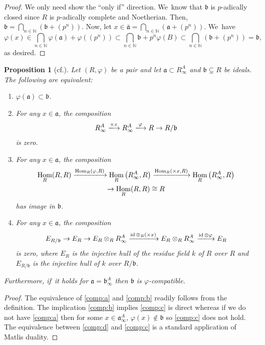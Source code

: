 \documentclass[11pt]{article}
\newcommand{\cf}{cf.\xspace}
\theoremstyle{plain}
\newtheorem{proposition}[theorem]{Proposition}
\theoremstyle{definition}
\numberwithin{equation}{theorem}
\let\tensor\otimes
\newcommand{\N}{\mathbb {N}}
\newcommand{\fra}{\mathfrak{a}}
\newcommand{\frab}{\mathfrak{b}}
\DeclareMathOperator{\Hom}{Hom}
\DeclareMathOperator{\id}{{id}}
\renewcommand{\phi}{\varphi}
\newcommand{\rphi}{(R,\phi)}
\newcommand{\rafty}{R^A_\infty}
\newcommand{\aafty}{\fra^A_\infty}
\begin{document}
\begin{proof}
We only need show the ``only if'' direction. We~know that $\frab$ is $p$-adically closed since $R$ is $p$-adically complete and Noetherian. Then, $\frab=\bigcap_{n\in \N} (\frab+ (p^n))$. Now, let $x\in \bar{\fra} = \bigcap_{n\in \N} (\fra+ (p^n))$. We~have \[
\phi(x)\in \bigcap_{n\in \N} \phi(\fra)+\phi((p^n))\subset \bigcap_{n\in \N} \frab+p^n\phi\left(B\right) \subset \bigcap_{n\in \N} (\frab+ (p^n))=\frab,
\]
as desired.
\end{proof}

\begin{proposition}[{\cf \cite[Lem.\,5.1]{SchwedeCentersOfFPurity}}]\label{comp ideal of pair injective hull}
Let $\rphi$ be a pair and let $\fra\subset \rafty$ and $\frab \subsetneq R$ be ideals. The following are equivalent:

\begin{enumerate}
\item\label{comp:a} $\phi\left(\fra\right)\subset \frab$.
\item\label{comp:b} For any $x\in \fra$, the composition\vspace*{-3pt}
\[
\rafty \xlongrightarrow{\times x} \rafty \xlongrightarrow{\phi} R \to R/\frab
\]
is zero.
\item\label{comp:c} For any $x\in \fra$, the composition\vspace*{-5pt}
\begin{multline*}
\Hom_R(R,R)\xlongrightarrow{\Hom_R(\phi,R)}\Hom_R\left(\rafty,R\right)\xlongrightarrow{\Hom_R(\times x, R)}\Hom_R\left(\rafty,R\right)\\
\to \Hom_R(R,R)\cong R
\end{multline*}
has image in $\frab$.
\item\label{comp:d}
For any $x\in \fra$, the composition\vspace*{-3pt}
\[
E_{R/\frab} \to E_R \to E_R\tensor_R \rafty \xlongrightarrow{\id\tensor_R (\times x)} E_R\tensor_R \rafty \xlongrightarrow{\id \tensor \phi} E_R
\]
is zero, where $E_R$ is the injective hull of the residue field $k$ of $R$ over $R$ and $E_{R/\frab} $ is the injective hull of $k$ over $R/\frab$.
\end{enumerate}

Furthermore, if~it holds for $\fra=\frab^A_\infty$ then $\frab$ is $\phi$-compatible.
\end{proposition}

\begin{proof}
The equivalence of \eqref{comp:a} and \eqref{comp:b} readily follows from the definition. The implication \eqref{comp:b} implies \eqref{comp:c} is direct whereas if we do not have \eqref{comp:a} then for some $x\in \aafty$, $\phi(x)\notin \frab$ so \eqref{comp:c} does not hold.
The equivalence between \eqref{comp:d} and \eqref{comp:c} is a standard application of Matlis duality.
\end{proof}
\end{document}
